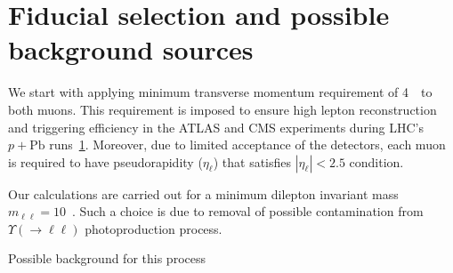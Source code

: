 \section{Fiducial selection and possible background sources}
We start with applying minimum transverse momentum requirement of 4~\GeV\ to both muons.
This requirement is imposed to ensure high lepton reconstruction and triggering efficiency in the ATLAS and CMS experiments during LHC's $p+\textrm{Pb}$ runs~\ref{}.
Moreover, due to limited acceptance of the detectors, each muon is required to have pseudorapidity ($\eta_{\ell}$) that satisfies $|\eta_{\ell}|<2.5$ condition.

Our calculations are carried out for a minimum dilepton invariant mass $m_{\ell\ell} = 10$~\GeV. 
Such a choice is due to removal of possible contamination from $\Upsilon(\rightarrow \ell\ell)$ photoproduction process.

Possible background for this process



